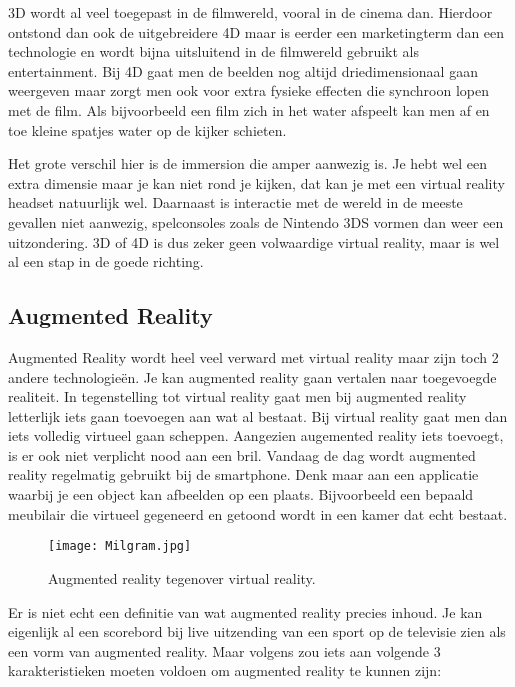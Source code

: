 3D wordt al veel toegepast in de filmwereld, vooral in de cinema dan. Hierdoor ontstond dan ook de uitgebreidere 4D maar is eerder een marketingterm dan een technologie en wordt bijna uitsluitend in de filmwereld gebruikt als entertainment. Bij 4D gaat men de beelden nog altijd driedimensionaal gaan weergeven maar zorgt men ook voor extra fysieke effecten die synchroon lopen met de film. Als bijvoorbeeld een film zich in het water afspeelt kan men af en toe kleine spatjes water op de kijker schieten.

Het grote verschil hier is de immersion die amper aanwezig is. Je hebt wel een extra dimensie maar je kan niet rond je kijken, dat kan je met een virtual reality headset natuurlijk wel. Daarnaast is interactie met de wereld in de meeste gevallen niet aanwezig, spelconsoles zoals de Nintendo 3DS vormen dan weer een uitzondering. 3D of 4D is dus zeker geen volwaardige virtual reality, maar is wel al een stap in de goede richting.

\subsection{Augmented Reality}
\label{subsec:augmented-reality}
Augmented Reality wordt heel veel verward met virtual reality maar zijn toch 2 andere technologieën. Je kan augmented reality gaan vertalen naar toegevoegde realiteit. In tegenstelling tot virtual reality gaat men bij augmented reality letterlijk iets gaan toevoegen aan wat al bestaat. Bij virtual reality gaat men dan iets volledig virtueel gaan scheppen. Aangezien augemented reality iets toevoegt, is er ook niet verplicht nood aan een bril. Vandaag de dag wordt augmented reality regelmatig gebruikt bij de smartphone. Denk maar aan een applicatie waarbij je een object kan afbeelden op een plaats. Bijvoorbeeld een bepaald meubilair die virtueel gegeneerd en getoond wordt in een kamer dat echt bestaat.

\begin{figure}
	\centering
	\texttt{[image: Milgram.jpg]}
	\caption{Augmented reality tegenover virtual reality.}
	\label{fig:ar-vs-vr}
\end{figure}

Er is niet echt een definitie van wat augmented reality precies inhoud. Je kan eigenlijk al een scorebord bij live uitzending van een sport op de televisie zien als een vorm van augmented reality. Maar volgens \autocite{Azuma1997} zou iets aan volgende 3 karakteristieken moeten voldoen om augmented reality te kunnen zijn:

